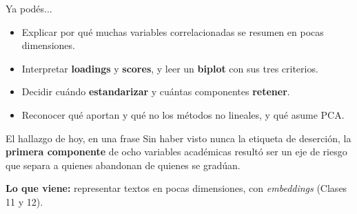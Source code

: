 \documentclass[aspectratio=169,xcolor=dvipsnames]{beamer}
\begin{document}
\begin{frame}{Ya pod\'es...}
    \begin{itemize}
        \item Explicar por qu\'e muchas variables correlacionadas se resumen en pocas dimensiones.
        \item Interpretar \textbf{loadings} y \textbf{scores}, y leer un \textbf{biplot} con sus tres criterios.
        \item Decidir cu\'ando \textbf{estandarizar} y cu\'antas componentes \textbf{retener}.
        \item Reconocer qu\'e aportan y qu\'e no los m\'etodos no lineales, y qu\'e asume PCA.
    \end{itemize}
    \vfill
    \begin{block}{El hallazgo de hoy, en una frase}
        Sin haber visto nunca la etiqueta de deserci\'on, la \textbf{primera componente} de ocho variables acad\'emicas result\'o ser un \alert{eje de riesgo} que separa a quienes abandonan de quienes se grad\'uan.
    \end{block}
    \vfill
    {\footnotesize \textbf{Lo que viene:} representar textos en pocas dimensiones, con \emph{embeddings} (Clases 11 y 12).}
\end{frame}
\end{document}
